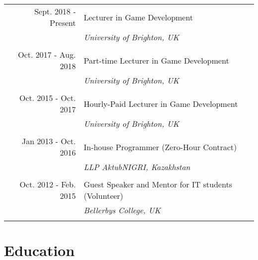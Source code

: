 \documentclass[a4paper,11pt]{article} %
\begin{document}
\begin{tabular}{r|p{11cm}}

Sept. 2018 - Present & Lecturer in Game Development\\
& \emph{University of Brighton, UK}\\
\multicolumn{2}{c}{} \\


Oct. 2017 - Aug. 2018 & Part-time Lecturer in Game Development\\
& \emph{University of Brighton, UK}\\
\multicolumn{2}{c}{} \\


Oct. 2015 - Oct. 2017 & Hourly-Paid Lecturer in Game Development\\
& \emph{University of Brighton, UK}\\
\multicolumn{2}{c}{} \\


Jan 2013 - Oct. 2016 & In-house Programmer (Zero-Hour Contract)\\
& \emph{LLP AktubNIGRI, Kazakhstan}\\
\multicolumn{2}{c}{} \\


Oct. 2012 - Feb. 2015 & Guest Speaker and Mentor for IT students (Volunteer)\\
& \emph{Bellerbys College, UK}\\
\multicolumn{2}{c}{} \\

\end{tabular}


\section{Education}
\end{document}

